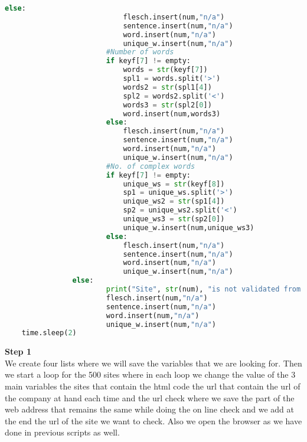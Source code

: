 \documentclass{article}
\begin{document}
\begin{lstlisting}[language=Python]
                        else:
                            flesch.insert(num,"n/a")
                            sentence.insert(num,"n/a")
                            word.insert(num,"n/a")
                            unique_w.insert(num,"n/a")  
                        #Number of words
                        if keyf[7] != empty:
                            words = str(keyf[7])
                            spl1 = words.split('>')
                            words2 = str(spl1[4])
                            spl2 = words2.split('<')
                            words3 = str(spl2[0])
                            word.insert(num,words3)
                        else:
                            flesch.insert(num,"n/a")
                            sentence.insert(num,"n/a")
                            word.insert(num,"n/a")
                            unique_w.insert(num,"n/a")  
                        #No. of complex words
                        if keyf[7] != empty:
                            unique_ws = str(keyf[8])
                            sp1 = unique_ws.split('>')
                            unique_ws2 = str(sp1[4])
                            sp2 = unique_ws2.split('<')
                            unique_ws3 = str(sp2[0])
                            unique_w.insert(num,unique_ws3)
                        else:
                            flesch.insert(num,"n/a")
                            sentence.insert(num,"n/a")
                            word.insert(num,"n/a")
                            unique_w.insert(num,"n/a")  
                else:
                        print("Site", str(num), "is not validated from check 2")
                        flesch.insert(num,"n/a")
                        sentence.insert(num,"n/a")
                        word.insert(num,"n/a")
                        unique_w.insert(num,"n/a")            
    time.sleep(2)
\end{lstlisting}
\textbf{Step 1} \\We create four lists where we will save the variables that we are looking for. Then we start a loop for the 500 sites where in each loop we change the value of the 3 main variables the sites that contain the html code the url that contain the url of the company at hand each time and the url check where we save the part of the web address that remains the same while doing the on line check and we add at the end the url of the site we want to check. Also we open the browser as we have done in previous scripts as well.\\\\
\end{document}
